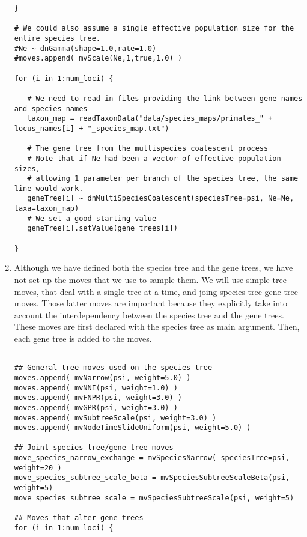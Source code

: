 \begin{enumerate}
{\begin{snugshade*}
\begin{lstlisting}
}

# We could also assume a single effective population size for the entire species tree.
#Ne ~ dnGamma(shape=1.0,rate=1.0)
#moves.append( mvScale(Ne,1,true,1.0) )

for (i in 1:num_loci) {

   # We need to read in files providing the link between gene names and species names
   taxon_map = readTaxonData("data/species_maps/primates_" + locus_names[i] + "_species_map.txt")

   # The gene tree from the multispecies coalescent process
   # Note that if Ne had been a vector of effective population sizes,
   # allowing 1 parameter per branch of the species tree, the same line would work.
   geneTree[i] ~ dnMultiSpeciesCoalescent(speciesTree=psi, Ne=Ne, taxa=taxon_map)
   # We set a good starting value
   geneTree[i].setValue(gene_trees[i])

}

\end{lstlisting}
\end{snugshade*}}

\item Although we have defined both the species tree and the gene trees, we have not set up the moves that we use to sample them.
We will use simple tree moves, that deal with a single tree at a time, and joing species tree-gene tree moves.
Those latter moves are important because they explicitly take into account the interdependency between the species tree and the gene trees.
These moves are first declared with the species tree as main argument. 
Then, each gene tree is added to the moves.


{\tt \begin{snugshade*}
\begin{lstlisting}

## General tree moves used on the species tree
moves.append( mvNarrow(psi, weight=5.0) )
moves.append( mvNNI(psi, weight=1.0) )
moves.append( mvFNPR(psi, weight=3.0) )
moves.append( mvGPR(psi, weight=3.0) )
moves.append( mvSubtreeScale(psi, weight=3.0) )
moves.append( mvNodeTimeSlideUniform(psi, weight=5.0) )

## Joint species tree/gene tree moves
move_species_narrow_exchange = mvSpeciesNarrow( speciesTree=psi, weight=20 )
move_species_subtree_scale_beta = mvSpeciesSubtreeScaleBeta(psi, weight=5)
move_species_subtree_scale = mvSpeciesSubtreeScale(psi, weight=5)

## Moves that alter gene trees
for (i in 1:num_loci) {


\end{lstlisting}
\end{snugshade*}}
\end{enumerate}

